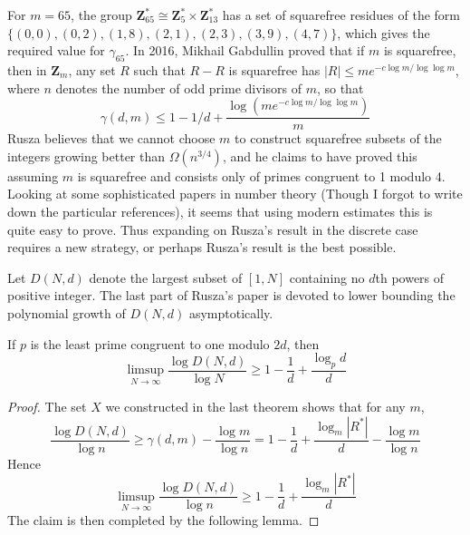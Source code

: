 For $m = 65$, the group $\mathbf{Z}_{65}^* \cong \mathbf{Z}_{5}^* \times \mathbf{Z}_{13}^*$ has a set of squarefree residues of the form $\{ (0,0), (0,2), (1,8), (2,1), (2,3), (3,9), (4,7) \}$, which gives the required value for $\gamma_{65}$. In 2016, Mikhail Gabdullin proved that if $m$ is squarefree, then in $\mathbf{Z}_m$, any set $R$ such that $R - R$ is squarefree has $|R| \leq me^{-c \log m / \log \log m}$, where $n$ denotes the number of odd prime divisors of $m$, so that
%
\[ \gamma(d,m) \leq 1 - 1/d + \frac{\log(me^{-c \log m / \log \log m})}{m} \]
%
Rusza believes that we cannot choose $m$ to construct squarefree subsets of the integers growing better than $\Omega(n^{3/4})$, and he claims to have proved this assuming $m$ is squarefree and consists only of primes congruent to 1 modulo 4. Looking at some sophisticated papers in number theory (Though I forgot to write down the particular references), it seems that using modern estimates this is quite easy to prove. Thus expanding on Rusza's result in the discrete case requires a new strategy, or perhaps Rusza's result is the best possible.

Let $D(N,d)$ denote the largest subset of $[1,N]$ containing no $d$th powers of positive integer. The last part of Rusza's paper is devoted to lower bounding the polynomial growth of $D(N,d)$ asymptotically.

\begin{theorem}
    If $p$ is the least prime congruent to one modulo $2d$, then
    \[ \limsup_{N \to \infty} \frac{\log D(N,d)}{\log N} \geq 1 - \frac{1}{d} + \frac{\log_p d}{d} \]
\end{theorem}
\begin{proof}
    The set $X$ we constructed in the last theorem shows that for any $m$,
    \[ \frac{\log D(N,d)}{\log n} \geq \gamma(d,m) - \frac{\log m}{\log n} = 1 - \frac{1}{d} + \frac{\log_m |R^*|}{d} - \frac{\log m}{\log n} \]
    Hence
    \[ \limsup_{N \to \infty} \frac{\log D(N,d)}{\log n} \geq 1 - \frac{1}{d} + \frac{\log_m |R^*|}{d} \]
    The claim is then completed by the following lemma.
\end{proof}

